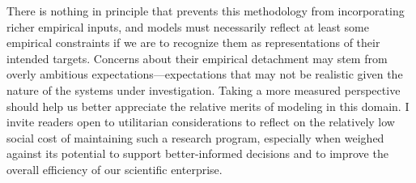 \documentclass{article}
\begin{document}
There is nothing in principle that prevents this methodology from incorporating richer empirical inputs, and models must necessarily reflect at least some empirical constraints if we are to recognize them as representations of their intended targets. Concerns about their empirical detachment may stem from overly ambitious expectations—expectations that may not be realistic given the nature of the systems under investigation. Taking a more measured perspective should help us better appreciate the relative merits of modeling in this domain. I invite readers open to utilitarian considerations to reflect on the relatively low social cost of maintaining such a research program, especially when weighed against its potential to support better-informed decisions and to improve the overall efficiency of our scientific enterprise.





\end{document}
